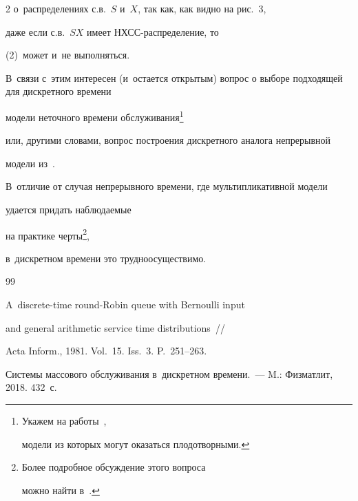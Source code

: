 \begin{multicols}{2}
о~распределениях с.в.~$S$ и~$X$, так как, как видно на рис.~3,

даже если с.в.~$SX$ имеет НХСС-рас\-пре\-де\-ле\-ние, то

(2)~может и~не выполняться.

 

 В~связи с~этим интересен (и~остается открытым) вопрос о выборе подходящей для дискретного времени

модели неточного времени обслуживания\footnote{Укажем на работы~\cite{sx1,sx2}, 

модели из которых могут оказаться плодотворными.}

или, другими словами, вопрос построения дискретного аналога непрерывной 

модели из~\cite{Mat-2}.



В~отличие от случая непрерывного времени, где мультипликативной модели 

удается придать наблюдаемые

на практике черты\footnote{Более подробное обсуждение этого вопроса 

можно найти в~\cite[Secion 6.3]{Mat}.},

в~дискретном времени это трудноосуществимо.



{\small\frenchspacing

 {%


 \begin{thebibliography}{99}





A~discrete-time round-Robin queue with Bernoulli input

and general arithmetic service time distributions~//

Acta Inform., 1981. Vol.~15. Iss.~3. P.~251--263.







Системы массового обслуживания в~дискретном времени.~--- M.: Физматлит, 2018. 432~с.





\end{thebibliography}}}
\end{multicols}

